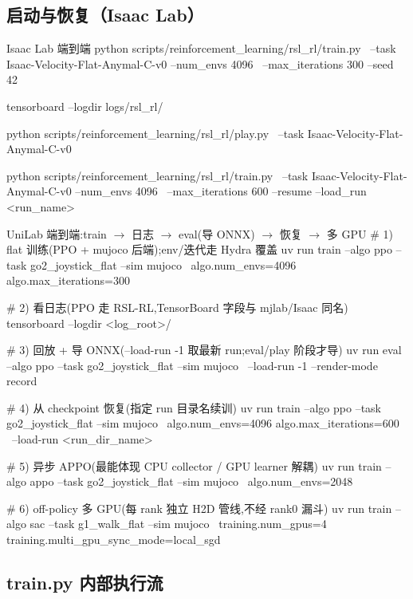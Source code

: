\subsection{启动与恢复（Isaac Lab）}

\begin{codebox}[bash]{Isaac Lab 端到端}
python scripts/reinforcement_learning/rsl_rl/train.py \
  --task Isaac-Velocity-Flat-Anymal-C-v0 --num_envs 4096 \
  --max_iterations 300 --seed 42

tensorboard --logdir logs/rsl_rl/

python scripts/reinforcement_learning/rsl_rl/play.py \
  --task Isaac-Velocity-Flat-Anymal-C-v0

python scripts/reinforcement_learning/rsl_rl/train.py \
  --task Isaac-Velocity-Flat-Anymal-C-v0 --num_envs 4096 \
  --max_iterations 600 --resume --load_run <run_name>
\end{codebox}

\begin{codebox}[bash]{UniLab 端到端:train $\to$ 日志 $\to$ eval(导 ONNX) $\to$ 恢复 $\to$ 多 GPU}
# 1) flat 训练(PPO + mujoco 后端);env/迭代走 Hydra 覆盖
uv run train --algo ppo --task go2_joystick_flat --sim mujoco \
    algo.num_envs=4096 algo.max_iterations=300

# 2) 看日志(PPO 走 RSL-RL,TensorBoard 字段与 mjlab/Isaac 同名)
tensorboard --logdir <log_root>/

# 3) 回放 + 导 ONNX(--load-run -1 取最新 run;eval/play 阶段才导)
uv run eval --algo ppo --task go2_joystick_flat --sim mujoco \
    --load-run -1 --render-mode record

# 4) 从 checkpoint 恢复(指定 run 目录名续训)
uv run train --algo ppo --task go2_joystick_flat --sim mujoco \
    algo.num_envs=4096 algo.max_iterations=600 \
    --load-run <run_dir_name>

# 5) 异步 APPO(最能体现 CPU collector / GPU learner 解耦)
uv run train --algo appo --task go2_joystick_flat --sim mujoco \
    algo.num_envs=2048

# 6) off-policy 多 GPU(每 rank 独立 H2D 管线,不经 rank0 漏斗)
uv run train --algo sac --task g1_walk_flat --sim mujoco \
    training.num_gpus=4 training.multi_gpu_sync_mode=local_sgd
\end{codebox}

\subsection{train.py 内部执行流}

